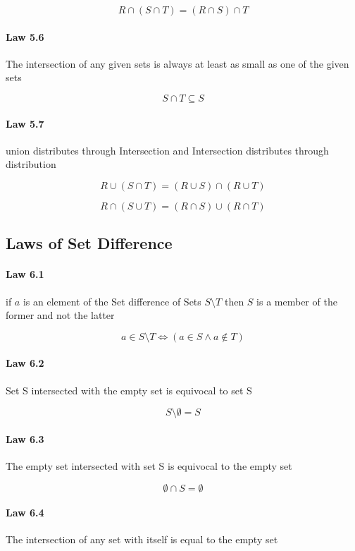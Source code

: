 \documentclass[twocolumn]{article}
\begin{document}
$$ R  \cap  (S  \cap  T) = (R  \cap  S)  \cap  T $$

\paragraph{Law 5.6} The intersection of any given sets is always at least as small as one of the given sets

$$ S \cap T \subseteq S $$

\paragraph{Law 5.7} union distributes through Intersection and Intersection distributes through distribution

$$ R  \cup  (S  \cap  T) = (R  \cup  S)  \cap  (R  \cup  T) $$

$$ R  \cap  (S  \cup  T) = (R  \cap  S)  \cup  (R  \cap  T) $$

\subsection{Laws of Set Difference}

\paragraph{Law 6.1} if $a$ is an element of the Set difference of Sets $S \setminus T$ then $S$ is a member of the former and not the latter

$$ a  \in  S \setminus T \iff (a  \in  S \wedge a \not\in T) $$

\paragraph{Law 6.2} Set S intersected with the empty set is equivocal to set S

$$ S \setminus \emptyset  = S  $$

\paragraph{Law 6.3} The empty set intersected with set S is equivocal to the empty set

$$  \emptyset \cap S =  \emptyset  $$

\paragraph{Law 6.4} The intersection of any set with itself is equal to the empty set
\end{document}
